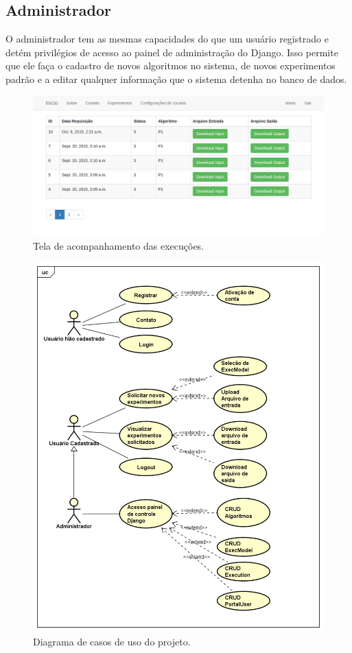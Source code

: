 \documentclass[tg]{mdtufsm}
\begin{document}
\subsection{Administrador}
O administrador tem as mesmas capacidades do que um usuário registrado e detém privilégios de acesso ao painel de administração do Django. Isso permite que ele faça o cadastro de novos algoritmos no sistema, de novos experimentos padrão e a editar qualquer informação que o sistema detenha no banco de dados.
\begin{figure}
	\centering
	\includegraphics[width=1\textwidth]{userhome}
	\caption{
		Tela de acompanhamento das execuções.
	}
	\label{fig:funcional}
\end{figure}
\begin{figure}
	\centering
	\includegraphics[width=1\textwidth]{UseCase_tg}
	\caption{
		Diagrama de casos de uso do projeto.
	}
	\label{fig:usecase}
\end{figure}
\end{document}
